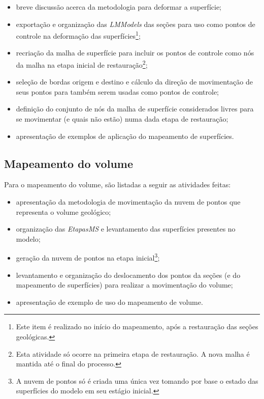 \renewcommand{\labelitemi}{•}
\begin{itemize}
  \item breve discussão acerca da metodologia para deformar a superfície;
  \item exportação e organização das \emph{LMModels} das seções para uso como pontos de controle na deformação das superfícies\footnote{Este item é realizado no início do mapeamento, após a restauração das seções geológicas.};
  \item recriação da malha de superfície para incluir os pontos de controle como nós da malha na etapa inicial de restauração\footnote{Esta atividade só ocorre na primeira etapa de restauração. A nova malha é mantida até o final do processo.};
  \item seleção de bordas origem e destino e cálculo da direção de movimentação de seus pontos para também serem usadas como pontos de controle;
  \item definição do conjunto de nós da malha de superfície considerados livres para se movimentar (e quais não estão) numa dada etapa de restauração;
  \item apresentação de exemplos de aplicação do mapeamento de superfícies.
\end{itemize}

\subsection*{Mapeamento do volume}

Para o mapeamento do volume, são listadas a seguir as atividades feitas:

\renewcommand{\labelitemi}{•}
\begin{itemize}
  \item apresentação da metodologia de movimentação da nuvem de pontos que representa o volume geológico;
  \item organização das \emph{EtapasMS} e levantamento das superfícies presentes no modelo;
  \item geração da nuvem de pontos na etapa inicial\footnote{A nuvem de pontos só é criada uma única vez tomando por base o estado das superfícies do modelo em seu estágio inicial.};
  \item levantamento e organização do deslocamento dos pontos da seções (e do mapeamento de superfícies) para realizar a movimentação do volume;
  \item apresentação de exemplo de uso do mapeamento de volume.
\end{itemize}

